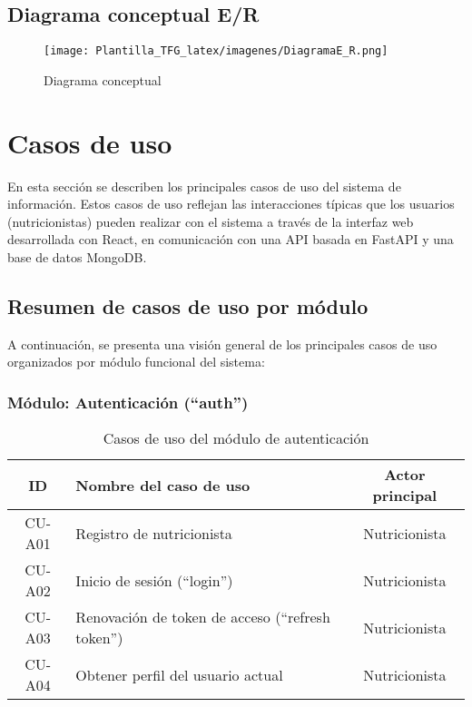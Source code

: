 \subsection{Diagrama conceptual E/R}
\begin{figure}[H]
    \centering
    \texttt{[image: Plantilla\_TFG\_latex/imagenes/DiagramaE\_R.png]}
    \caption{Diagrama conceptual}
    \label{fig:enter-label}
\end{figure}

\section{Casos de uso}
En esta sección se describen los principales casos de uso del sistema de información. Estos casos de uso reflejan las interacciones típicas que los usuarios (nutricionistas) pueden realizar con el sistema a través de la interfaz web desarrollada con React, en comunicación con una API basada en FastAPI y una base de datos MongoDB.

\subsection{Resumen de casos de uso por módulo}
A continuación, se presenta una visión general de los principales casos de uso organizados por módulo funcional del sistema:

\subsubsection*{Módulo: Autenticación (``auth'')}

\begin{table}[H]
\centering
\begin{tabular}{|c|p{7.5cm}|c|}
\hline
\textbf{ID} & \textbf{Nombre del caso de uso} & \textbf{Actor principal} \\
\hline
CU-A01 & Registro de nutricionista & Nutricionista \\
\hline
CU-A02 & Inicio de sesión (``login'') & Nutricionista \\
\hline
CU-A03 & Renovación de token de acceso (``refresh token'') & Nutricionista \\
\hline
CU-A04 & Obtener perfil del usuario actual & Nutricionista \\
\hline
\end{tabular}
\caption{Casos de uso del módulo de autenticación}
\end{table}

